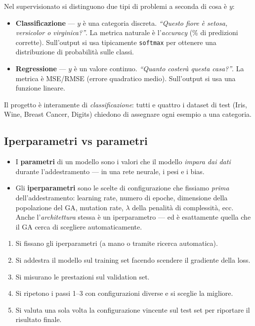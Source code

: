 \documentclass[11pt,a4paper]{article}
\newcommand{\fnt}{\texttt}     %
\begin{document}
Nel supervisionato si distinguono due tipi di problemi a seconda di cosa
è $y$:

\begin{itemize}
    \item \textbf{Classificazione} --- $y$ è una categoria discreta.
          \emph{``Questo fiore è setosa, versicolor o virginica?''}.
          La metrica naturale è l'\emph{accuracy} (\% di predizioni
          corrette). Sull'output si usa tipicamente \fnt{softmax} per
          ottenere una distribuzione di probabilità sulle classi.
    \item \textbf{Regressione} --- $y$ è un valore continuo.
          \emph{``Quanto costerà questa casa?''}. La metrica è MSE/RMSE
          (errore quadratico medio). Sull'output si usa una funzione
          lineare.
\end{itemize}

Il progetto è interamente di \emph{classificazione}: tutti e quattro i
dataset di test (Iris, Wine, Breast Cancer, Digits) chiedono di assegnare
ogni esempio a una categoria.

\subsection{Iperparametri vs parametri}

\begin{itemize}
    \item I \textbf{parametri} di un modello sono i valori che il modello
          \emph{impara dai dati} durante l'addestramento --- in una rete
          neurale, i pesi e i bias.
    \item Gli \textbf{iperparametri} sono le scelte di configurazione che
          fissiamo \emph{prima} dell'addestramento: learning rate, numero
          di epoche, dimensione della popolazione del GA, mutation rate,
          $\lambda$ della penalità di complessità, ecc. Anche
          l'\emph{architettura} stessa è un iperparametro --- ed è
          esattamente quella che il GA cerca di scegliere automaticamente.
\end{itemize}

\begin{concetto}
\begin{enumerate}
    \item Si fissano gli iperparametri (a mano o tramite ricerca automatica).
    \item Si addestra il modello sul training set facendo scendere il
          gradiente della loss.
    \item Si misurano le prestazioni sul validation set.
    \item Si ripetono i passi 1--3 con configurazioni diverse e si sceglie
          la migliore.
    \item Si valuta una sola volta la configurazione vincente sul test set
          per riportare il risultato finale.
\end{enumerate}
\end{concetto}
\end{document}
